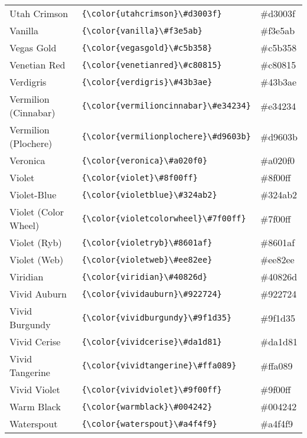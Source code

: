 \documentclass[9.5pt]{article}
\begin{document}
\begin{longtable}{l | l | l}
	Utah Crimson & \verb!{\color{utahcrimson}\#d3003f}! & {\color{utahcrimson}\#d3003f}\\
	Vanilla & \verb!{\color{vanilla}\#f3e5ab}! & {\color{vanilla}\#f3e5ab}\\
	Vegas Gold & \verb!{\color{vegasgold}\#c5b358}! & {\color{vegasgold}\#c5b358}\\
	Venetian Red & \verb!{\color{venetianred}\#c80815}! & {\color{venetianred}\#c80815}\\
	Verdigris & \verb!{\color{verdigris}\#43b3ae}! & {\color{verdigris}\#43b3ae}\\
	Vermilion (Cinnabar) & \verb!{\color{vermilioncinnabar}\#e34234}! & {\color{vermilioncinnabar}\#e34234}\\
	Vermilion (Plochere) & \verb!{\color{vermilionplochere}\#d9603b}! & {\color{vermilionplochere}\#d9603b}\\
	Veronica & \verb!{\color{veronica}\#a020f0}! & {\color{veronica}\#a020f0}\\
	Violet & \verb!{\color{violet}\#8f00ff}! & {\color{violet}\#8f00ff}\\
	Violet-Blue & \verb!{\color{violetblue}\#324ab2}! & {\color{violetblue}\#324ab2}\\
	Violet (Color Wheel) & \verb!{\color{violetcolorwheel}\#7f00ff}! & {\color{violetcolorwheel}\#7f00ff}\\
	Violet (Ryb) & \verb!{\color{violetryb}\#8601af}! & {\color{violetryb}\#8601af}\\
	Violet (Web) & \verb!{\color{violetweb}\#ee82ee}! & {\color{violetweb}\#ee82ee}\\
	Viridian & \verb!{\color{viridian}\#40826d}! & {\color{viridian}\#40826d}\\
	Vivid Auburn & \verb!{\color{vividauburn}\#922724}! & {\color{vividauburn}\#922724}\\
	Vivid Burgundy & \verb!{\color{vividburgundy}\#9f1d35}! & {\color{vividburgundy}\#9f1d35}\\
	Vivid Cerise & \verb!{\color{vividcerise}\#da1d81}! & {\color{vividcerise}\#da1d81}\\
	Vivid Tangerine & \verb!{\color{vividtangerine}\#ffa089}! & {\color{vividtangerine}\#ffa089}\\
	Vivid Violet & \verb!{\color{vividviolet}\#9f00ff}! & {\color{vividviolet}\#9f00ff}\\
	Warm Black & \verb!{\color{warmblack}\#004242}! & {\color{warmblack}\#004242}\\
	Waterspout & \verb!{\color{waterspout}\#a4f4f9}! & {\color{waterspout}\#a4f4f9}\\

\end{longtable}
\end{document}
